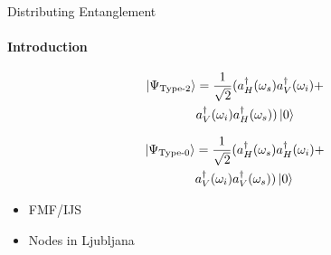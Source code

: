 \documentclass[serif,8pt]{beamer}
\begin{document}
\begin{frame}{Distributing Entanglement}
	\framesubtitle{Introduction}
	\begin{minipage}[l]{0.48\textwidth}
		\begin{equation*}
		\begin{aligned}
			\ket{\Psi_{\text{Type-2}}} &= \frac{1}{\sqrt{2}}(a_{H}^{\dagger}(\omega_s)a_{V}^{\dagger}(\omega_i)+\\
								&a_{V}^{\dagger}(\omega_i)a_{H}^{\dagger}(\omega_s))\ket{0}\\
		\end{aligned}
		\end{equation*}
	\end{minipage}
	\begin{minipage}[r]{0.48\textwidth}
	\begin{equation*}
		\begin{aligned}
			\ket{\Psi_{\text{Type-0}}} &= \frac{1}{\sqrt{2}}(a_{H}^{\dagger}(\omega_s)a_{H}^{\dagger}(\omega_i)+\\
									   &a_{V}^{\dagger}(\omega_i)a_{V}^{\dagger}(\omega_s))\ket{0}
		\end{aligned}
	\end{equation*}
	\end{minipage}
	\begin{itemize}
		\item FMF/IJS
		\item Nodes in Ljubljana %
	\end{itemize}
\end{frame}
\end{document}
